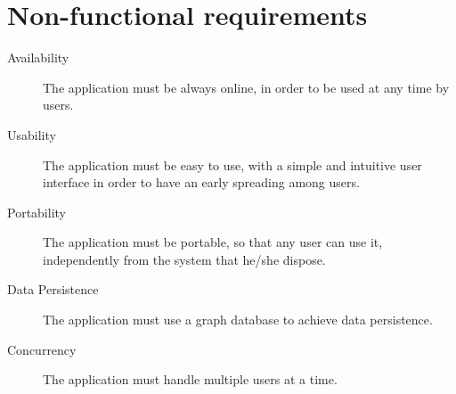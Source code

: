 \section{Non-functional requirements}\label{sec:nonfunctionalrequirements}

\begin{description}
	\item[Availability] The application must be always online, in order to
		be used at any time by users.
	\item[Usability] The application must be easy to use, with a simple and
		intuitive user interface in order to have an early spreading
		among users.
	\item[Portability] The application must be portable, so that any user
		can use it, independently from the system that he/she dispose.
	\item[Data Persistence] The application must use a graph database to
		achieve data persistence.
	\item[Concurrency] The application must handle multiple users at a time.
\end{description}